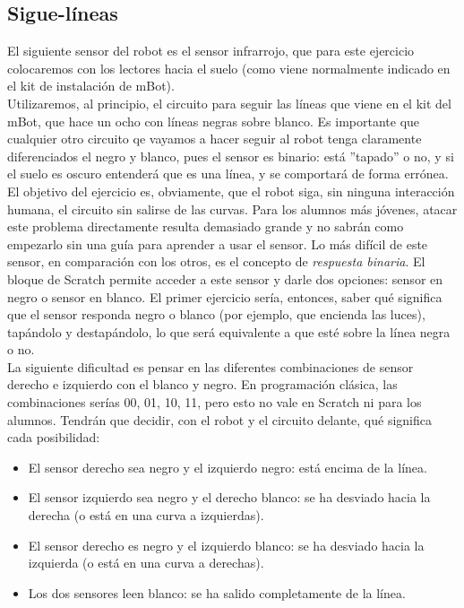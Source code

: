 \subsection{Sigue-líneas}\label{ej:sigueLineas}
El siguiente sensor del robot es el sensor infrarrojo, que para este ejercicio colocaremos con los lectores hacia el suelo (como viene normalmente indicado en el kit de instalación de mBot).\\
Utilizaremos, al principio, el circuito para seguir las líneas que viene en el kit del mBot, que hace un ocho con líneas negras sobre blanco. Es importante que cualquier otro circuito qe vayamos a hacer seguir al robot tenga claramente diferenciados el negro y blanco, pues el sensor es binario: está ''tapado'' o no, y si el suelo es oscuro entenderá que es una línea, y se comportará de forma errónea.\\
El objetivo del ejercicio es, obviamente, que el robot siga, sin ninguna interacción humana, el circuito sin salirse de las curvas. Para los alumnos más jóvenes, atacar este problema directamente resulta demasiado grande y no sabrán como empezarlo sin una guía para aprender a usar el sensor. Lo más difícil de este sensor, en comparación con los otros, es el concepto de \textit{respuesta binaria}. El bloque de Scratch permite acceder a este sensor y darle dos opciones: sensor en negro o sensor en blanco. El primer ejercicio sería, entonces, saber qué significa que el sensor responda negro o blanco (por ejemplo, que encienda las luces), tapándolo y destapándolo, lo que será equivalente a que esté sobre la línea negra o no.\\
La siguiente dificultad es pensar en las diferentes combinaciones de sensor derecho e izquierdo con el blanco y negro. En programación clásica, las combinaciones serías 00, 01, 10, 11, pero esto no vale en Scratch ni para los alumnos. Tendrán que decidir, con el robot y el circuito delante, qué significa cada posibilidad:
\begin{itemize}
	\item El sensor derecho sea negro y el izquierdo negro: está encima de la línea.
	\item El sensor izquierdo sea negro y el derecho blanco: se ha desviado hacia la derecha (o está en una curva a izquierdas).
	\item El sensor derecho es negro y el izquierdo blanco: se ha desviado hacia la izquierda (o está en una curva a derechas).
	\item Los dos sensores leen blanco: se ha salido completamente de la línea.
\end{itemize}
